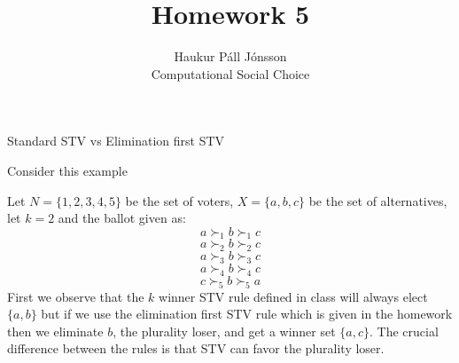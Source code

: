 \documentclass[12pt]{article}
\newenvironment{question}[2][Question]{\begin{trivlist}
\item[\hskip \labelsep {\bfseries #1}\hskip \labelsep {\bfseries #2.}]}{\end{trivlist}}
\newenvironment{answer}[2][Answer]{\begin{trivlist}
\item[\hskip \labelsep {\bfseries #1}\hskip \labelsep {\bfseries #2:}]}{\end{trivlist}}
\begin{document}
\renewcommand{\theenumi}{\roman{enumi}}

\let\oldsum\sum
\renewcommand{\sum}[3]{\oldsum\limits_{#1}^{#2}#3}
\let\oldprod\prod
\renewcommand{\prod}[3]{\oldprod\limits_{#1}^{#2}#3}

\newcommand\Dunion{
  \mathop{\mathchoice
    {\ooalign{$\displaystyle\bigcup$\cr\hss\scalebox{.65}{\raisebox{0.45ex}{\sffamily +}}\hss}}
    {\ooalign{$\textstyle\bigcup$\cr\hss\scalebox{.9}{\raisebox{0.5ex}{\tiny\sffamily +}}\hss}}
    {\ooalign{$\scriptstyle\bigcup$\cr\hss\scalebox{.45}{\raisebox{0.3ex}{\sffamily +}}\hss}}
    {\ooalign{$\scriptscriptstyle\bigcup$\cr\hss\scalebox{.38}{\raisebox{0.3ex}{\sffamily +}}\hss}}
    }
}

\title{Homework 5}
\author{Haukur Páll Jónsson\\
Computational Social Choice}

\maketitle

\begin{question}{1}{Standard STV vs Elimination first STV}

Consider this example
\end{question}

\begin{answer}{a)}{}
Let $N=\{1,2,3,4,5\}$ be the set of voters, $X=\{a,b,c\}$ be the set of alternatives, let $k=2$ and the ballot given as: \\
$$a\succ_1 b\succ_1 c$$
$$a\succ_2 b\succ_2 c$$
$$a\succ_3 b\succ_3 c$$
$$a\succ_4 b\succ_4 c$$
$$c\succ_5 b\succ_5 a$$
First we observe that the $k$ winner STV rule defined in class will always elect $\{a,b\}$ but if we use the elimination first STV rule which is given in the homework then we eliminate $b$, the plurality loser, and get a winner set $\{a,c\}$. The crucial difference between the rules is that STV can favor the plurality loser.
\end{answer}
\end{document}
